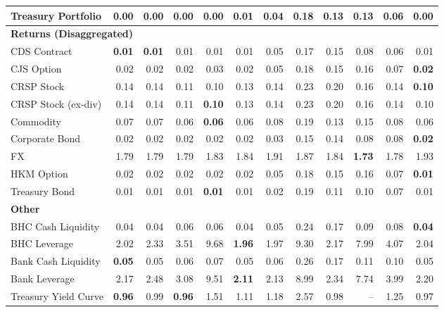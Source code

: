 \begin{table}[htbp]
\begin{tabular}{@{}lrrrrrrrrrrr@{}}
Treasury Portfolio & 0.00 & 0.00 & \textbf{0.00} & 0.00 & 0.01 & 0.04 & 0.18 & 0.13 & 0.13 & 0.06 & 0.00 \\
\midrule
\multicolumn{12}{l}{\textbf{Returns (Disaggregated)}} \\
CDS Contract & \textbf{0.01} & \textbf{0.01} & 0.01 & 0.01 & 0.01 & 0.05 & 0.17 & 0.15 & 0.08 & 0.06 & 0.01 \\
CJS Option & 0.02 & 0.02 & 0.02 & 0.03 & 0.02 & 0.05 & 0.18 & 0.15 & 0.16 & 0.07 & \textbf{0.02} \\
CRSP Stock & 0.14 & 0.14 & 0.11 & 0.10 & 0.13 & 0.14 & 0.23 & 0.20 & 0.16 & 0.14 & \textbf{0.10} \\
CRSP Stock (ex-div) & 0.14 & 0.14 & 0.11 & \textbf{0.10} & 0.13 & 0.14 & 0.23 & 0.20 & 0.16 & 0.14 & 0.10 \\
Commodity & 0.07 & 0.07 & 0.06 & \textbf{0.06} & 0.06 & 0.08 & 0.19 & 0.13 & 0.15 & 0.08 & 0.06 \\
Corporate Bond & 0.02 & 0.02 & 0.02 & 0.02 & 0.02 & 0.03 & 0.15 & 0.14 & 0.08 & 0.08 & \textbf{0.02} \\
FX & 1.79 & 1.79 & 1.79 & 1.83 & 1.84 & 1.91 & 1.87 & 1.84 & \textbf{1.73} & 1.78 & 1.93 \\
HKM Option & 0.02 & 0.02 & 0.02 & 0.02 & 0.02 & 0.05 & 0.18 & 0.15 & 0.16 & 0.07 & \textbf{0.01} \\
Treasury Bond & 0.01 & 0.01 & 0.01 & \textbf{0.01} & 0.01 & 0.02 & 0.19 & 0.11 & 0.10 & 0.07 & 0.01 \\
\midrule
\multicolumn{12}{l}{\textbf{Other}} \\
BHC Cash Liquidity & 0.04 & 0.04 & 0.06 & 0.06 & 0.04 & 0.05 & 0.24 & 0.17 & 0.09 & 0.08 & \textbf{0.04} \\
BHC Leverage & 2.02 & 2.33 & 3.51 & 9.68 & \textbf{1.96} & 1.97 & 9.30 & 2.17 & 7.99 & 4.07 & 2.04 \\
Bank Cash Liquidity & \textbf{0.05} & 0.05 & 0.06 & 0.07 & 0.05 & 0.06 & 0.26 & 0.17 & 0.11 & 0.10 & 0.05 \\
Bank Leverage & 2.17 & 2.48 & 3.08 & 9.51 & \textbf{2.11} & 2.13 & 8.99 & 2.34 & 7.74 & 3.99 & 2.20 \\
Treasury Yield Curve & \textbf{0.96} & 0.99 & \textbf{0.96} & 1.51 & 1.11 & 1.18 & 2.57 & 0.98 & -- & 1.25 & 0.97 \\
\bottomrule
\end{tabular}
\vspace{0.1cm}

\end{table}
